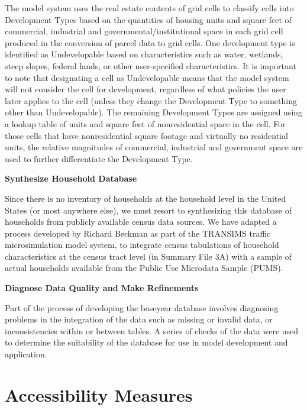 \begin{description}
The model system uses the real estate contents of grid cells to
classify cells into Development Types based on the quantities of
housing units and square feet of commercial, industrial and
governmental/institutional space in each grid cell produced in the
conversion of parcel data to grid cells.  One development type is
identified as Undevelopable based on characteristics such as
water, wetlands, steep slopes, federal lands, or other
user-specified characteristics. It is important to note that
designating a cell as Undevelopable means that the model system
will not consider the cell for development, regardless of what
policies the user later applies to the cell (unless they change
the Development Type to something other than Undevelopable).  The
remaining Development Types are assigned using a lookup table of
units and square feet of nonresidential space in the cell.  For
those cells that have nonresidential square footage and virtually
no residential units, the relative magnitudes of commercial,
industrial and government space are used to further differentiate
the Development Type.

\item{\textbf{Synthesize Household Database}}

Since there is no inventory of households at the household level
in the United States (or most anywhere else), we must resort to
synthesizing this database of households from publicly available
census data sources. We have adapted a process developed by
Richard Beckman as part of the TRANSIMS traffic microsimulation
model system, to integrate census tabulations of household
characteristics at the census tract level (in Summary File 3A)
with a sample of actual households available from the Public Use
Microdata Sample (PUMS).

\item{\textbf{Diagnose Data Quality and Make Refinements}}

Part of the process of developing the baseyear database involves
diagnosing problems in the integration of the data such as missing
or invalid data, or inconsistencies within or between tables. A
series of checks of the data were used to determine the
suitability of the database for use in model development and
application.
\end{description}

\section{Accessibility Measures}

